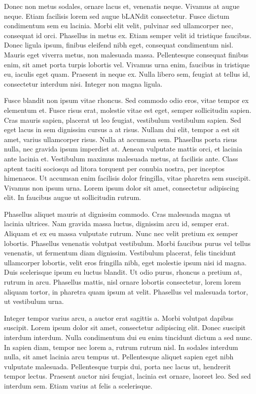 \documentclass{report}
\begin{document}
Donec non metus sodales, ornare lacus et, venenatis neque. Vivamus at augue neque. Etiam facilisis lorem sed augue b\gls{LAN}dit consectetur. Fusce dictum condimentum sem eu lacinia. Morbi elit velit, pulvinar sed ullamcorper nec, consequat id orci. Phasellus in metus ex. Etiam semper velit id tristique faucibus. Donec ligula ipsum, finibus eleifend nibh eget, consequat condimentum nisl. Mauris eget viverra metus, non malesuada massa. Pellentesque consequat finibus enim, sit amet porta turpis lobortis vel. Vivamus urna enim, faucibus in tristique eu, iaculis eget quam. Praesent in neque ex. Nulla libero sem, feugiat at tellus id, consectetur interdum nisi. Integer non magna ligula.

Fusce blandit non ipsum vitae rhoncus. Sed commodo odio eros, vitae tempor ex elementum et. Fusce risus erat, molestie vitae est eget, semper sollicitudin sapien. Cras mauris sapien, placerat ut leo feugiat, vestibulum vestibulum sapien. Sed eget lacus in sem dignissim cursus a at risus. Nullam dui elit, tempor a est sit amet, varius ullamcorper risus. Nulla at accumsan sem. Phasellus porta risus nulla, nec gravida ipsum imperdiet at. Aenean vulputate mattis orci, et lacinia ante lacinia et. Vestibulum maximus malesuada metus, at facilisis ante. Class aptent taciti sociosqu ad litora torquent per conubia nostra, per inceptos himenaeos. Ut accumsan enim facilisis dolor fringilla, vitae pharetra sem suscipit. Vivamus non ipsum urna. Lorem ipsum dolor sit amet, consectetur adipiscing elit. In faucibus augue ut sollicitudin rutrum.

Phasellus aliquet mauris at dignissim commodo. Cras malesuada magna ut lacinia ultrices. Nam gravida massa luctus, dignissim arcu id, semper erat. Aliquam et ex eu massa vulputate rutrum. Nunc nec velit pretium ex semper lobortis. Phasellus venenatis volutpat vestibulum. Morbi faucibus purus vel tellus venenatis, ut fermentum diam dignissim. Vestibulum placerat, felis tincidunt ullamcorper lobortis, velit eros fringilla nibh, eget molestie ipsum nisi id magna. Duis scelerisque ipsum eu luctus blandit. Ut odio purus, rhoncus a pretium at, rutrum in arcu. Phasellus mattis, nisl ornare lobortis consectetur, lorem lorem aliquam tortor, in pharetra quam ipsum at velit. Phasellus vel malesuada tortor, ut vestibulum urna.

Integer tempor varius arcu, a auctor erat sagittis a. Morbi volutpat dapibus suscipit. Lorem ipsum dolor sit amet, consectetur adipiscing elit. Donec suscipit interdum interdum. Nulla condimentum dui eu enim tincidunt dictum a sed nunc. In sapien diam, tempor nec lorem a, rutrum rutrum nisl. In sodales interdum nulla, sit amet lacinia arcu tempus ut. Pellentesque aliquet sapien eget nibh vulputate malesuada. Pellentesque turpis dui, porta nec lacus ut, hendrerit tempor lectus. Praesent auctor nisi feugiat, lacinia est ornare, laoreet leo. Sed sed interdum sem. Etiam varius at felis a scelerisque.
\end{document}
